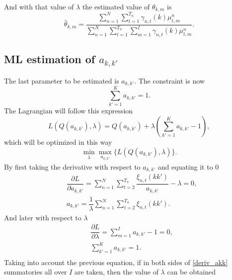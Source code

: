 \documentclass[12pt]{article}
\begin{document}
And with that value of $\lambda$ the estimated value of $\theta_{k,m}$ is
\begin{equation}
\widehat{\theta}_{k,m} = \dfrac{\sum \limits_{n=1}^{N} \sum \limits_ { t = 1 } ^ { T _ { n } }\gamma_{n,t}(k)\mu_{t,m}^{n}}{\sum \limits_{n=1}^{N}\sum \limits_ { t = 1 } ^ { T _ { n } }\sum \limits_{m=1}^{I}\gamma_{n,t}(k)\mu_{t,m}^{n}}.
\end{equation}
\subsection{ML estimation of $a_{k,k'}$}
The last parameter to be estimated is $a_{k,k'}$. The constraint is now
\begin{equation}
\label{constraint_akk}
\sum \limits_{k'=1}^{K} a_{k,k'} = 1.
\end{equation}
The Lagrangian will follow this expression
\begin{equation}
\label{lagrange_akk}
L\left( Q(a_{k,k'}),\lambda \right) = Q(a_{k,k'}) + \lambda \left( \sum \limits_{k'=1}^{K} a_{k,k'} - 1 \right),
\end{equation}
which will be optimized in this way
\begin{equation}
\label{minmax_lagrange_akk}
\min_{\substack{\lambda}} \max_{\substack{a_{k,k'}}} \lbrace L\left( Q(a_{k,k'}),\lambda \right) \rbrace.
\end{equation}
By first taking the derivative with respect to $a_{k,k'}$ and equating it to 0
\begin{equation}
\label{deriv_akk}
\begin{split}
& \dfrac{\partial L}{\partial a_{k,k'}} = \sum \limits_{n=1}^{N}\sum _ { t = 2 } ^ { T _ { n } } \dfrac{\xi_{n,t}(kk')}{a_{k,k'}} - \lambda = 0, \\
& a_{k,k'} = \dfrac{1}{\lambda} \sum \limits_{n=1}^{N} \sum _ { t = 2 } ^ { T _ { n } }\xi_{n,t}(kk').
\end{split}
\end{equation}
And later with respect to $\lambda$
\begin{equation}
\begin{split}
& \dfrac{\partial L}{\partial \lambda} = \sum \limits_{m=1}^{I} a_{k,k'} - 1 = 0 ,\\
& \sum \limits_{k'=1}^{K} a_{k,k'} = 1.\\
\end{split}
\end{equation}
Taking into account the previous equation, if in both sides of \eqref{deriv_akk} summatories all over $I$ are taken, then the value of $\lambda$ can be obtained
\end{document}
